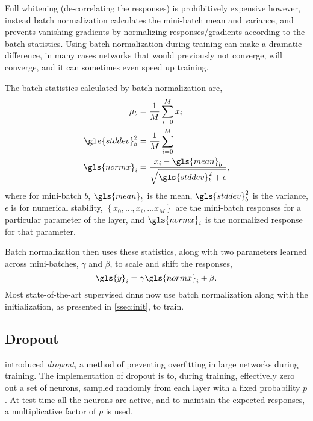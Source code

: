 \documentclass[thesis]{subfiles}
\begin{document}
Full whitening (\ie de-correlating the responses) is prohibitively expensive however, instead batch normalization calculates the mini-batch mean and variance, and prevents vanishing gradients by normalizing responses/gradients according to the batch statistics. Using batch-normalization during training can make a dramatic difference, in many cases networks that would previously not converge, will converge, and it can sometimes even speed up training.

The batch statistics calculated by batch normalization are,
\begin{equation}
\begin{aligned}
    \mu_b &= \frac{1}{M} \sum^M_{i=0} x_i\\
    \gls{stddev}^2_b &= \frac{1}{M} \sum^M_{i=0}\\
    \gls{normx}_i &= \frac{x_i - \gls{mean}_b}{\sqrt{\gls{stddev}^2_b + \epsilon}},
\end{aligned}
\end{equation}
where for mini-batch $b$, $\gls{mean}_b$ is the mean, $\gls{stddev}^2_b$ is the variance, $\epsilon$ is for numerical stability, $\left\{x_0, \ldots, x_i, \ldots x_M\right\}$ are the mini-batch responses for a particular parameter of the layer, and $\gls{normx}_i$ is the normalized response for that parameter. 

Batch normalization then uses these statistics, along with two parameters learned across mini-batches, $\gamma$ and $\beta$, to scale and shift the responses,
\begin{equation}    
    \gls{y}_i = \gamma \gls{normx}_i + \beta.
\end{equation}
%
Most state-of-the-art supervised \glspl{dnn} now use batch normalization along with the initialization, as presented in \cref{ssec:init}, to train.

\subsection{Dropout}
\citet{dropout,dropoutjmlr} introduced \emph{dropout}, a method of preventing overfitting in large networks during training. The implementation of dropout is to, during training, effectively zero out a set of neurons, sampled randomly from each layer with a fixed probability $p$. At test time all the neurons are active, and to maintain the expected responses, a multiplicative factor of $p$ is used.
\end{document}
